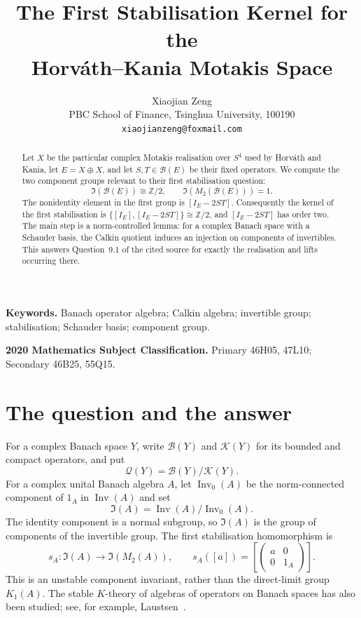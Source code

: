 \documentclass[11pt]{article}
\title{The First Stabilisation Kernel for the\\Horv\'ath--Kania Motakis Space}
\author{Xiaojian Zeng\\
PBC School of Finance, Tsinghua University, 100190\\
\texttt{xiaojianzeng@foxmail.com}}
\date{}
\theoremstyle{remark}
\newcommand{\B}{\mathcal B}
\newcommand{\K}{\mathcal K}
\newcommand{\Q}{\mathcal Q}
\newcommand{\Inv}{\operatorname{Inv}}
\newcommand{\Invzero}{\operatorname{Inv}_0}
\newcommand{\Id}{\mathfrak I}
\begin{document}
\maketitle

\begin{abstract}
Let $X$ be the particular complex Motakis realisation over $S^4$ used by
Horv\'ath and Kania, let $E=X\oplus X$, and let $S,T\in\B(E)$ be their fixed
operators.  We compute the two component groups relevant to their first
stabilisation question:
\[
  \Id(\B(E))\cong \mathbb Z/2,
  \qquad
  \Id(M_2(\B(E)))=1.
\]
The nonidentity element in the first group is $[I_E-2ST]$.  Consequently the
kernel of the first stabilisation is
\(
\{[I_E],[I_E-2ST]\}\cong\mathbb Z/2
\), and $[I_E-2ST]$ has order two.  The main step is a norm-controlled lemma:
for a complex Banach space with a Schauder basis, the Calkin quotient induces
an injection on components of invertibles.  This answers Question~9.1 of the
cited source for exactly the realisation and lifts occurring there.
\end{abstract}

\noindent\textbf{Keywords.}
Banach operator algebra; Calkin algebra; invertible group; stabilisation;
Schauder basis; component group.

\medskip
\noindent\textbf{2020 Mathematics Subject Classification.}
Primary 46H05, 47L10; Secondary 46B25, 55Q15.

\section{The question and the answer}

For a complex Banach space $Y$, write $\B(Y)$ and $\K(Y)$ for its bounded and
compact operators, and put
\[
  \Q(Y)=\B(Y)/\K(Y).
\]
For a complex unital Banach algebra $A$, let $\Invzero(A)$ be the norm-connected
component of $1_A$ in $\Inv(A)$ and set
\[
  \Id(A)=\Inv(A)/\Invzero(A).
\]
The identity component is a normal subgroup, so $\Id(A)$ is the group of
components of the invertible group.  The first stabilisation homomorphism is
\[
 s_A:\Id(A)\longrightarrow\Id(M_2(A)),
 \qquad
 s_A([a])=
 \left[\begin{pmatrix}a&0\\0&1_A\end{pmatrix}\right].
\]
This is an unstable component invariant, rather than the direct-limit group
$K_1(A)$.  The stable $K$-theory of algebras of operators on Banach spaces has
also been studied; see, for example, Laustsen~\cite{Laustsen1997}.
\end{document}
